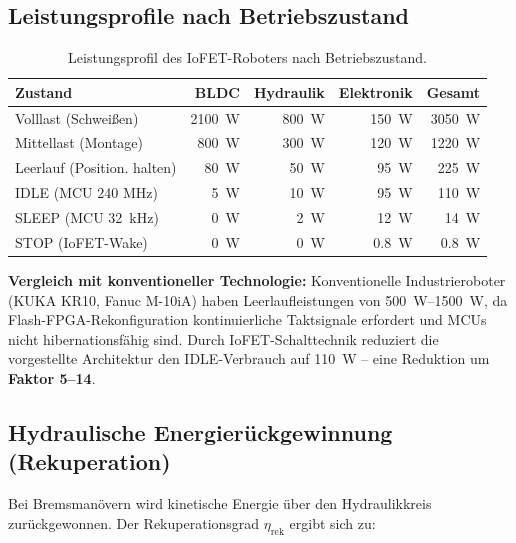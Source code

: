 ﻿\documentclass[a4paper,12pt]{scrreprt}
\theoremstyle{definition}
\begin{document}
\subsection{Leistungsprofile nach Betriebszustand}

\begin{table}[H]
\centering
\caption{Leistungsprofil des IoFET-Roboters nach Betriebszustand.}
\label{tab:power}
\small
\begin{tabular}{|l|r|r|r|r|}
\hline
\rowcolor{iofetblue!20}
\textbf{Zustand} & \textbf{BLDC} & \textbf{Hydraulik} & \textbf{Elektronik} & \textbf{Gesamt} \\
\hline
Volllast (Schweißen) & \SI{2100}{\watt} & \SI{800}{\watt} & \SI{150}{\watt} & \SI{3050}{\watt} \\
\hline
Mittellast (Montage) & \SI{800}{\watt} & \SI{300}{\watt} & \SI{120}{\watt} & \SI{1220}{\watt} \\
\hline
Leerlauf (Position. halten) & \SI{80}{\watt} & \SI{50}{\watt} & \SI{95}{\watt} & \SI{225}{\watt} \\
\hline
IDLE (MCU 240 MHz) & \SI{5}{\watt} & \SI{10}{\watt} & \SI{95}{\watt} & \SI{110}{\watt} \\
\hline
SLEEP (MCU 32~kHz) & \SI{0}{\watt} & \SI{2}{\watt} & \SI{12}{\watt} & \SI{14}{\watt} \\
\hline
STOP (IoFET-Wake) & \SI{0}{\watt} & \SI{0}{\watt} & \SI{0.8}{\watt} & \SI{0.8}{\watt} \\
\hline
\end{tabular}
\end{table}

\begin{infobox}
\textbf{Vergleich mit konventioneller Technologie:}
Konventionelle Industrieroboter (KUKA KR10, Fanuc M-10iA) haben
Leerlaufleistungen von \SI{500}{\watt}--\SI{1500}{\watt}, da
Flash-FPGA-Rekonfiguration kontinuierliche Taktsignale erfordert
und MCUs nicht hibernationsfähig sind. Durch IoFET-Schalttechnik
reduziert die vorgestellte Architektur den IDLE-Verbrauch auf
\SI{110}{\watt} -- eine Reduktion um \textbf{Faktor 5--14}.
\end{infobox}

\subsection{Hydraulische Energierückgewinnung (Rekuperation)}

Bei Bremsmanövern wird kinetische Energie über den Hydraulikkreis
zurückgewonnen. Der Rekuperationsgrad $\eta_{\text{rek}}$ ergibt sich
zu:
\end{document}
